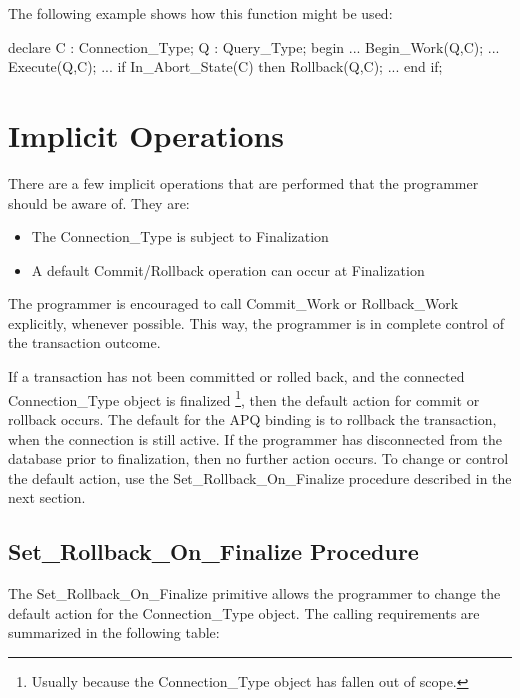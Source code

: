 \documentclass[english,letterpaper]{book}
\begin{document}
The following example shows how this function might be used:

\begin{Example}
declare
   C : Connection_Type;
   Q : Query_Type;
begin
   ...
   Begin_Work(Q,C);
   ...
   Execute(Q,C);
   ...
   if In_Abort_State(C) then
      Rollback(Q,C);
      ...
   end if;
\end{Example}

\section{Implicit Operations}

There are a few implicit operations that are performed that the programmer
should be aware of. They are:

\begin{itemize}
   \item The Connection\_Type is subject to Finalization
   \item A default Commit/Rollback operation can occur at Finalization
\end{itemize}

The programmer is encouraged to call Commit\_Work or Rollback\_Work
explicitly, whenever possible. This way, the programmer is in complete
control of the transaction outcome.

If a transaction has not been committed or rolled back, and the connected
Connection\_Type object is finalized%
\footnote{Usually because the Connection\_Type object has fallen out of scope.%
}, then the default action for commit or rollback occurs. The default
for the APQ binding is to rollback the transaction, when the connection
is still active. If the programmer has disconnected from the database
prior to finalization, then no further action occurs. To change or
control the default action, use the Set\_Rollback\_On\_Finalize procedure
described in the next section.


\subsection{Set\_Rollback\_On\_Finalize Procedure\label{Set_Rollback_On_Finalize Procedure}}

The Set\_Rollback\_On\_Finalize primitive allows the programmer to
change the default action for the Connection\_Type object. The calling
requirements are summarized in the following table:%
\end{document}
